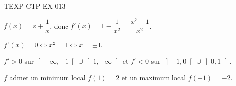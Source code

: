\begin{corrige}{TEXP-CTP-EX-013}

$f(x) = x + \dfrac{1}{x}$, donc $f'(x) = 1 - \dfrac{1}{x^2} = \dfrac{x^2-1}{x^2}$.


$f'(x) = 0 \iff x^2 = 1 \iff x = \pm 1$.

$f' > 0$ sur $\left]-\infty, -1\right[ \cup \left]1, +\infty\right[$ et $f' < 0$ sur $\left]-1, 0\right[ \cup \left]0, 1\right[$.

$f$ admet un minimum local $f(1) = 2$ et un maximum local $f(-1) = -2$.

\end{corrige}
